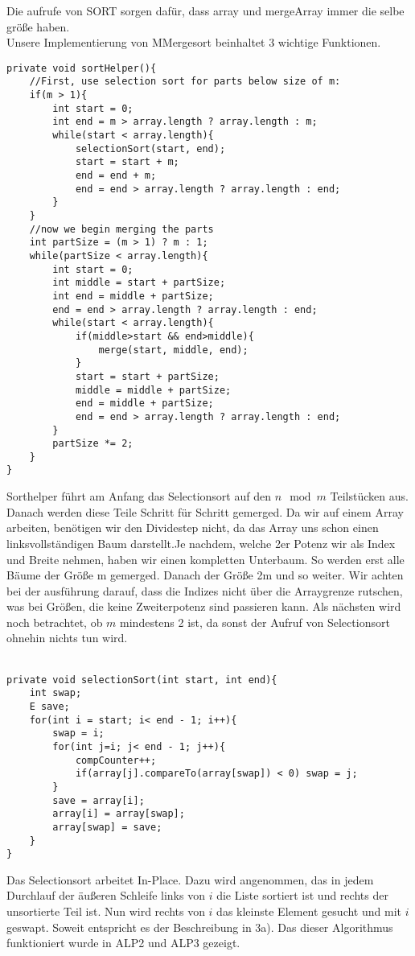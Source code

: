 \documentclass[11pt,a4paper,ngerman]{article}
\begin{document}
Die aufrufe von SORT sorgen dafür, dass array und mergeArray immer die selbe größe haben.\\
Unsere Implementierung von MMergesort beinhaltet 3 wichtige Funktionen.\\
\begin{lstlisting}
private void sortHelper(){
	//First, use selection sort for parts below size of m:
	if(m > 1){
		int start = 0;
		int end = m > array.length ? array.length : m;
		while(start < array.length){
			selectionSort(start, end);
			start = start + m;
			end = end + m;
			end = end > array.length ? array.length : end;
		}
	}
	//now we begin merging the parts
	int partSize = (m > 1) ? m : 1;
	while(partSize < array.length){
		int start = 0;
		int middle = start + partSize;
		int end = middle + partSize;
		end = end > array.length ? array.length : end;
		while(start < array.length){
			if(middle>start && end>middle){
				merge(start, middle, end);
			}
			start = start + partSize;
			middle = middle + partSize;
			end = middle + partSize;
			end = end > array.length ? array.length : end;
		}
		partSize *= 2;
	}
}
\end{lstlisting}

Sorthelper führt am Anfang das Selectionsort auf den $n \mod m$ Teilstücken aus. Danach werden diese Teile Schritt für Schritt gemerged. Da wir auf einem Array arbeiten, benötigen wir den Dividestep nicht, da das Array uns schon einen linksvollständigen Baum darstellt.Je nachdem, welche 2er Potenz wir als Index und Breite nehmen, haben wir einen kompletten Unterbaum. So werden erst alle Bäume der Größe m gemerged. Danach der Größe 2m und so weiter. Wir achten bei der ausführung darauf, dass die Indizes nicht über die Arraygrenze rutschen, was bei Größen, die keine Zweiterpotenz sind passieren kann. Als nächsten wird noch betrachtet, ob $m$ mindestens 2 ist, da sonst der Aufruf von Selectionsort ohnehin nichts tun wird.\\
\vspace{\baselineskip}\\

\begin{lstlisting}
private void selectionSort(int start, int end){
	int swap;
	E save;
	for(int i = start; i< end - 1; i++){
		swap = i;
		for(int j=i; j< end - 1; j++){
			compCounter++;
			if(array[j].compareTo(array[swap]) < 0) swap = j;
		}
		save = array[i];
		array[i] = array[swap];
		array[swap] = save;
	}
}
\end{lstlisting}
Das Selectionsort arbeitet In-Place. Dazu wird angenommen, das in jedem Durchlauf der äußeren Schleife links von $i$ die Liste sortiert ist und rechts der unsortierte Teil ist. Nun wird rechts von $i$ das kleinste Element gesucht und mit $i$ geswapt. Soweit entspricht es der Beschreibung in 3a). Das dieser Algorithmus funktioniert wurde in ALP2 und ALP3 gezeigt.\\
\end{document}
